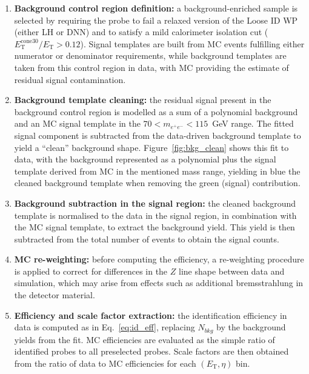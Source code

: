 \begin{enumerate}
    \item \textbf{Background control region definition:} a background-enriched sample is selected by requiring the probe to fail a relaxed version of the Loose ID WP (either LH or DNN) and to satisfy a mild calorimeter isolation cut ($E_{\mathrm{T}}^{\mathrm{cone30}}/E_{\mathrm{T}}>0.12$). Signal templates are built from MC events fulfilling either numerator or denominator requirements, while background templates are taken from this control region in data, with MC providing the estimate of residual signal contamination.

    \item \textbf{Background template cleaning:} the residual signal present in the background control region is modelled as a sum of a polynomial background and an MC signal template in the $70 < m_{e^+e^-} < 115$~GeV range. The fitted signal component is subtracted from the data-driven background template to yield a “clean” background shape. Figure~\ref{fig:bkg_clean} shows this fit to data, with the background represented as a polynomial plus the signal template derived from MC in the mentioned mass range, yielding in blue the cleaned background template when removing the green (signal) contribution.

    \item \textbf{Background subtraction in the signal region:} the cleaned background template is normalised to the data in the signal region, in combination with the MC signal template, to extract the background yield. This yield is then subtracted from the total number of events to obtain the signal counts.

    \item \textbf{MC re-weighting:} before computing the efficiency, a re-weighting procedure is applied to correct for differences in the $Z$ line shape between data and simulation, which may arise from effects such as additional bremsstrahlung in the detector material.

    \item \textbf{Efficiency and scale factor extraction:} the identification efficiency in data is computed as in Eq.~\ref{eq:id_eff}, replacing $N_{bkg}$ by the background yields from the fit. MC efficiencies are evaluated as the simple ratio of identified probes to all preselected probes. Scale factors are then obtained from the ratio of data to MC efficiencies for each $(E_{\mathrm{T}},\eta)$ bin.
\end{enumerate}

